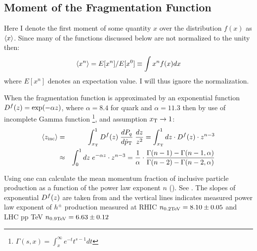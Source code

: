 \documentclass[12pt]{article}
\begin{document}
\subsection{Moment of the Fragmentation Function}

Here I denote the first moment of some quantity $x$ over the distribution $f(x)$  as $\left< x\right>$. Since many of the functions
discussed below are not normalized to the unity then:
\begin{equation}
\left< x^{n}\right> = E[x^n]/E[x^0]\equiv \int x^{n}f(x)dx
\end{equation}
where $E[x^{n}]$ denotes an expectation value. I will thus ignore the normalization.

When the fragmentation function is approximated by an exponential function $D^f(z)=\exp(-\alpha z)$, where $\alpha=8.4$ for quark and $\alpha=11.3$ \cite{Adler:2006sc} then  by use of incomplete Gamma function
\footnote{ $\Gamma(s,x)=\int_{x}^{\infty} e^{-t}t^{s-1}dt$ }, 
 and assumption $x_{\rm T}\to1$:
\begin{eqnarray}
\label{eq:meanz_inc}
\left< z_{\rm inc}\right> 	&=&   {\int_{x_{\rm T}}^{1}D^f(z)\;   {dP_q \over d\hat{p}_{\rm T}} \;      {dz\over z^{2}}} 
				  =   \int_{x_{\rm T}}^{1} dz \cdot D^f(z)\cdot z^{n-3}  \\ \nonumber
				&\approx& \int_{0}^{1}dz\; e^{-\alpha z}\cdot z^{n-3} = 
				{1\over \alpha}\cdot{\Gamma(n-1)-\Gamma(n-1,\alpha) \over \Gamma(n-2)-\Gamma(n-2,\alpha) }
\end{eqnarray}


Using  one can calculate the mean momentum fraction of inclusive particle production as a function of the power law exponent $n$ (). See . The slopes of exponential $D^f(z)$ are taken from \cite{Adler:2006sc} and the vertical lines indicates measured power law exponent of $h^{\pm}$ production measured at RHIC \cite{Adler:2006bw} $n_{\rm 0.2 TeV}=8.10\pm 0.05$ and LHC pp  TeV $n_{\rm 0.9 TeV}=6.63\pm0.12$ \cite{Aamodt:2010my}
\end{document}
